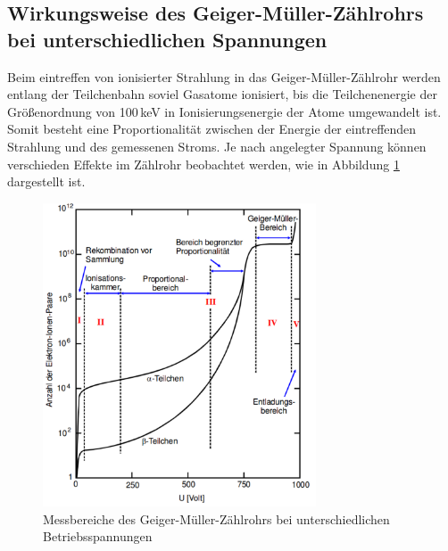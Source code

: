 \subsection{Wirkungsweise des Geiger-Müller-Zählrohrs bei unterschiedlichen Spannungen}
Beim eintreffen von ionisierter Strahlung in das Geiger-Müller-Zählrohr werden entlang der Teilchenbahn soviel Gasatome ionisiert, bis die Teilchenenergie der Größenordnung von 100\,keV in Ionisierungsenergie der Atome umgewandelt ist. Somit besteht eine Proportionalität zwischen der Energie der eintreffenden Strahlung und des gemessenen Stroms. Je nach angelegter Spannung können verschieden Effekte im Zählrohr beobachtet werden, wie in Abbildung \ref{fig:Geb} dargestellt ist.
\begin{figure}
  \centering
  \includegraphics[height=9cm]{picture/Gebiete.pdf}
  \caption{Messbereiche des Geiger-Müller-Zählrohrs bei unterschiedlichen Betriebsspannungen \cite{sample}}
  \label{fig:Geb}
\end{figure}

